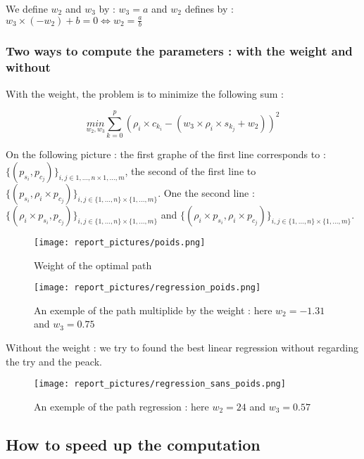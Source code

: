 \documentclass[a4,12pt]{article}
\begin{document}
	We define $w_2$ and $w_3$ by : $w_3=a$ and $w_2$ defines by : $w_3 \times (-w_2) + b = 0 \Leftrightarrow w_2 = \frac{a}{b}$
	
	\subsubsection{Two ways to compute the parameters : with the weight and without}
	
	With the weight, the problem is to minimize the following sum :
	
	\[ \underset{w_2,w_3}{min} \sum_{k=0}^p ( \rho_i \times c_{k_i} - ( w_3 \times \rho_i \times s_{k_j} + w_2) )^2 \]
	
	On the following picture : the first graphe of the first line corresponds to : $\{(p_{s_i}, p_{c_j})\}_{i,j \in {1, ..., n} \times {1, ..., m} }$, the second of the first line to $\{(p_{s_i}, \rho_i \times p_{c_j})\}_{i,j \in \{1, ..., n\} \times \{1, ..., m\} }$. One the second line : $\{(\rho_i \times p_{s_i}, p_{c_j})\}_{i,j \in \{1, ..., n\} \times \{1, ..., m\} }$ and $\{(\rho_i \times p_{s_i}, \rho_i \times p_{c_j})\}_{i,j \in \{1, ..., n\} \times \{1, ..., m\} }$.
	
	\begin{figure}[H]
		\centering
		\texttt{[image: report\_pictures/poids.png]}
		\caption{Weight of the optimal path}
		\label{reg_poids}
	\end{figure}	
	
	\begin{figure}[H]
		\centering
		\texttt{[image: report\_pictures/regression\_poids.png]}
		\caption{An exemple of the path multiplide by the weight : here $w_2=-1.31$ and $w_3=0.75$	}
		\label{reg_poids}
	\end{figure}	
	
	Without the weight : we try to found the best linear regression without regarding the try and the peack.
	
	\begin{figure}[H]
		\centering
		\texttt{[image: report\_pictures/regression\_sans\_poids.png]}
		\caption{An exemple of the path regression : here $w_2=24$ and $w_3=0.57$}
		\label{reg_sans_poids}
	\end{figure}
	
	\subsection{How to speed up the computation}
	
\end{document}
